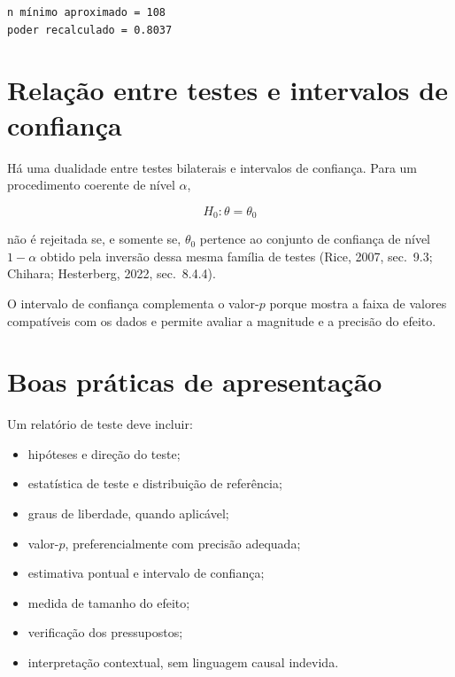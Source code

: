 \documentclass[
  letterpaper,
  DIV=11,
  numbers=noendperiod]{scrreprt}
\providecommand{\tightlist}{%
  \setlength{\itemsep}{0pt}\setlength{\parskip}{0pt}}\usepackage{longtable,booktabs,array}
\begin{document}
\begin{verbatim}
n mínimo aproximado = 108
poder recalculado = 0.8037
\end{verbatim}

\section{Relação entre testes e intervalos de
confiança}\label{relauxe7uxe3o-entre-testes-e-intervalos-de-confianuxe7a}

Há uma dualidade entre testes bilaterais e intervalos de confiança. Para
um procedimento coerente de nível \(\alpha\),

\[H_0:\theta=\theta_0\]

não é rejeitada se, e somente se, \(\theta_0\) pertence ao conjunto de
confiança de nível \(1-\alpha\) obtido pela inversão dessa mesma família
de testes (Rice, 2007, sec.~9.3; Chihara; Hesterberg, 2022, sec.~8.4.4).

\begin{tcolorbox}[enhanced jigsaw, colback=white, leftrule=.75mm, colbacktitle=quarto-callout-note-color!10!white, breakable, titlerule=0mm, bottomtitle=1mm, title=\textcolor{quarto-callout-note-color}{\faInfo}\hspace{0.5em}{Interpretação}, colframe=quarto-callout-note-color-frame, toprule=.15mm, opacityback=0, bottomrule=.15mm, opacitybacktitle=0.6, arc=.35mm, toptitle=1mm, rightrule=.15mm, coltitle=black, left=2mm]

O intervalo de confiança complementa o valor-\(p\) porque mostra a faixa
de valores compatíveis com os dados e permite avaliar a magnitude e a
precisão do efeito.

\end{tcolorbox}

\section{Boas práticas de
apresentação}\label{boas-pruxe1ticas-de-apresentauxe7uxe3o}

Um relatório de teste deve incluir:

\begin{itemize}
\tightlist
\item
  hipóteses e direção do teste;
\item
  estatística de teste e distribuição de referência;
\item
  graus de liberdade, quando aplicável;
\item
  valor-\(p\), preferencialmente com precisão adequada;
\item
  estimativa pontual e intervalo de confiança;
\item
  medida de tamanho do efeito;
\item
  verificação dos pressupostos;
\item
  interpretação contextual, sem linguagem causal indevida.
\end{itemize}
\end{document}
